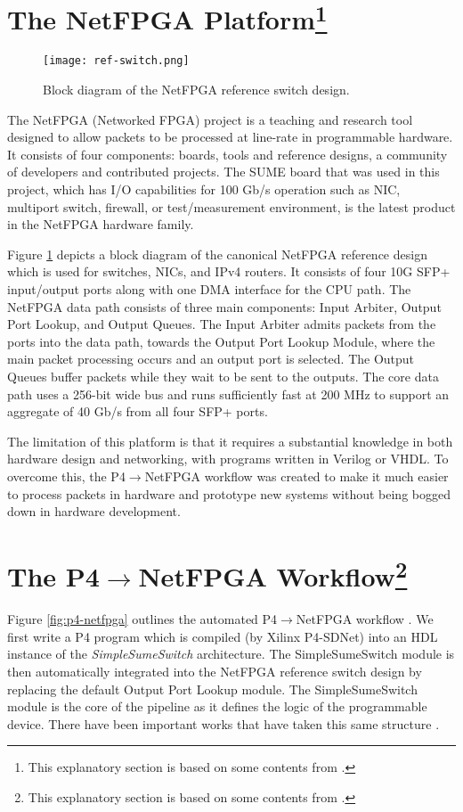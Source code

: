 \section[The NetFPGA Platform]{The NetFPGA Platform\footnote{This explanatory section is based on some contents from \cite{netfpgasume,fpga19}.}}
\label{sec:netfpga}
\begin{figure}[!h]
	\centering
	\texttt{[image: ref-switch.png]}
	\caption{Block diagram of the NetFPGA reference switch design.}
	\label{fig:ref-switch}
\end{figure}

The NetFPGA (Networked FPGA) project is a teaching and research tool designed to allow packets to be processed at line-rate in programmable hardware. It consists of four components: boards, tools and reference designs, a community of developers and contributed projects. The SUME board that was used in this project, which has I/O capabilities for 100 Gb/s operation such as NIC, multiport switch, firewall, or test/measurement environment, is the latest product in the NetFPGA hardware family. 

Figure \ref{fig:ref-switch} depicts a block diagram of the canonical NetFPGA reference design which is used for switches, NICs, and IPv4 routers. It consists of four 10G SFP+ input/output ports along with one DMA interface for the CPU path. The NetFPGA data path consists of three main components: Input Arbiter, Output Port Lookup, and Output Queues. The Input Arbiter admits packets from the ports into the data path, towards the Output Port Lookup Module, where the main packet processing occurs and an output port is selected. The Output Queues buffer packets while they wait to be sent to the outputs. The core data path uses a 256-bit wide bus and runs sufficiently fast at 200 MHz to support an aggregate of 40 Gb/s from all four SFP+ ports.

The limitation of this platform is that it requires a substantial knowledge in both hardware design and networking, with programs written in Verilog or VHDL. To overcome this, the P4$\rightarrow$NetFPGA workflow was created to make it much easier to process packets in hardware and prototype new systems without being bogged down in hardware development.

\section[The P4$\rightarrow$NetFPGA Workflow]{The P4$\rightarrow$NetFPGA Workflow\footnote{This explanatory section is based on some contents from \cite{fpga19, workflow}.}}
\label{sec:p4-netfpga}
Figure \ref{fig:p4-netfpga} outlines the automated P4$\rightarrow$NetFPGA workflow \cite{fpga19}. We first write a P4 program which is compiled (by Xilinx P4-SDNet) into an HDL instance of the \textit{SimpleSumeSwitch} architecture. The SimpleSumeSwitch module is then automatically integrated into the NetFPGA reference switch design by replacing the default Output Port Lookup module. The SimpleSumeSwitch module is the core of the pipeline as it defines the logic of the programmable device. There have been important works that have taken this same structure \cite{p4xos, emu}.

